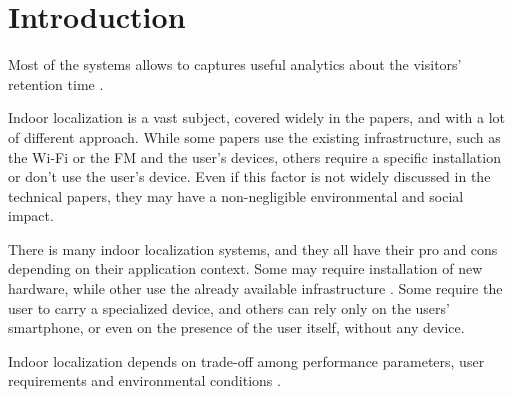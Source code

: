 \chapter{Introduction}

Most of the systems allows to captures useful analytics about the visitors' retention time \cite{spachos_ble_2020}.

Indoor localization is a vast subject, covered widely in the papers, and with a lot of different approach. While some papers use the existing infrastructure, such as the Wi-Fi or the FM and the user's devices, others require a specific installation or don't use the user's device. Even if this factor is not widely discussed in the technical papers, they may have a non-negligible environmental and social impact.

There is many indoor localization systems, and they all have their pro and cons depending on their application context. Some may require installation of new hardware, while other use the already available infrastructure \cite{ali_locali_2017}. Some require the user to carry a specialized device, and others can rely only on the users' smartphone, or even on the presence of the user itself, without any device.

Indoor localization depends on trade-off among performance parameters, user requirements and environmental conditions \cite{mainetti_survey_2014}.

